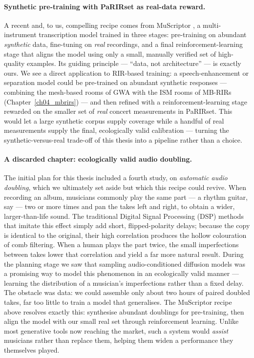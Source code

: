 \paragraph{Synthetic pre-training with PaRIRset as real-data reward.}
A recent and, to us, compelling recipe comes from MuScriptor
\citep{rouard2026muscriptor}, a multi-instrument transcription model trained in
three stages: pre-training on abundant \emph{synthetic} data, fine-tuning on
\emph{real} recordings, and a final reinforcement-learning stage that aligns the
model using only a small, manually verified set of high-quality examples. Its
guiding principle --- ``data, not architecture'' --- is exactly ours. We see a
direct application to \acrshort{RIR}-based training: a speech-enhancement or
separation model could be pre-trained on abundant synthetic responses ---
combining the mesh-based rooms of GWA \citep{tang2022gwa} with the \acrshort{ISM}
rooms of MB-RIRs (Chapter~\ref{ch04_mbrirs}) --- and then refined with
a reinforcement-learning stage rewarded on the smaller set of \emph{real} concert
measurements in PaRIRset. This would let a large synthetic corpus supply
coverage while a handful of real measurements supply the final, ecologically
valid calibration --- turning the synthetic-versus-real trade-off of this thesis
into a pipeline rather than a choice.

\vspace{1cm}

\paragraph{A discarded chapter: ecologically valid audio doubling.}
The initial plan for this thesis included a fourth study, on \emph{automatic
audio doubling}, which we ultimately set aside but which this recipe could
revive. When recording an album, musicians commonly play the same part --- a
rhythm guitar, say --- two or more times and pan the takes left and right, to
obtain a wider, larger-than-life sound. The traditional Digital Signal Processing (DSP) methods that imitate
this effect simply add short, flipped-polarity delays; because the copy is identical to
the original, their high correlation produces the hollow colouration of comb
filtering. When a human plays the part twice, the small imperfections between
takes lower that correlation and yield a far more natural result. During the
planning stage we saw that sampling audio-conditioned diffusion models was a
promising way to model this phenomenon in an ecologically valid manner ---
learning the distribution of a musician's imperfections rather than a fixed
delay. The obstacle was data: we could assemble only about two hours of paired
doubled takes, far too little to train a model that generalises. The MuScriptor
recipe above resolves exactly this: synthesise abundant doublings for
pre-training, then align the model with our small real set through reinforcement
learning. Unlike most generative tools now reaching the market, such a system
would \emph{assist} musicians rather than replace them, helping them widen a
performance they themselves played.

